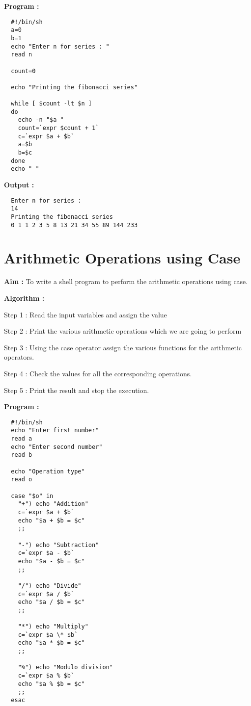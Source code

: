 \documentclass[journal,onecolumn]{IEEEtran}
\begin{document}
\textbf{Program : }
\begin{verbatim}
  #!/bin/sh
  a=0
  b=1
  echo "Enter n for series : "
  read n

  count=0

  echo "Printing the fibonacci series"

  while [ $count -lt $n ]
  do
    echo -n "$a "
    count=`expr $count + 1`
    c=`expr $a + $b`
    a=$b
    b=$c
  done
  echo " "
\end{verbatim}

\textbf{Output : }
\begin{verbatim}
  Enter n for series : 
  14
  Printing the fibonacci series
  0 1 1 2 3 5 8 13 21 34 55 89 144 233  
\end{verbatim}

\section{Arithmetic Operations using Case}
\textbf{Aim : } To write a shell program to perform the arithmetic operations using case.

\textbf{Algorithm : }
\begin{list}{}{}
  \item Step 1 : Read the input variables and assign the value
  \item Step 2 : Print the various arithmetic operations which we are going to perform
  \item Step 3 : Using the case operator assign the various functions for the arithmetic operators.
  \item Step 4 : Check the values for all the corresponding operations.
  \item Step 5 : Print the result and stop the execution.
\end{list}


\textbf{Program : }
\begin{verbatim}
  #!/bin/sh
  echo "Enter first number"
  read a
  echo "Enter second number"
  read b

  echo "Operation type"
  read o

  case "$o" in 
    "+") echo "Addition"
    c=`expr $a + $b`
    echo "$a + $b = $c"
    ;;

    "-") echo "Subtraction"
    c=`expr $a - $b`
    echo "$a - $b = $c"
    ;;

    "/") echo "Divide"
    c=`expr $a / $b`
    echo "$a / $b = $c"
    ;;

    "*") echo "Multiply"
    c=`expr $a \* $b`
    echo "$a * $b = $c"
    ;;

    "%") echo "Modulo division"
    c=`expr $a % $b`
    echo "$a % $b = $c"
    ;;
  esac
\end{verbatim}
\end{document}
